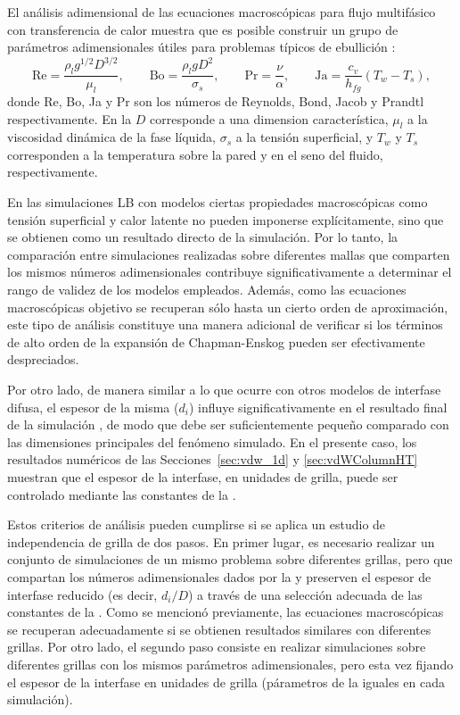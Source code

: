 El an\'alisis adimensional de las ecuaciones macrosc\'opicas para flujo multif\'asico con transferencia de calor muestra que es posible construir un grupo de par\'ametros adimensionales \'utiles para problemas t\'ipicos de ebullici\'on \cite{ajaev_modeling_2006, hua_numerical_2007}:
\begin{equation}
	\mbox{Re} = \dfrac{\rho_l g^{1/2} D^{3/2}}{\mu_l}, \qquad
	\mbox{Bo} = \dfrac{\rho_l g D^2}{\sigma_s}, \qquad
	\mbox{Pr} = \dfrac{\nu}{\alpha}, \qquad
	\mbox{Ja} = \dfrac{c_v}{h_{fg}}(T_w-T_s),
	\label{eq:num_adim_hetb}
\end{equation}
donde Re, Bo, Ja y Pr son los n\'umeros de Reynolds, Bond, Jacob y Prandtl respectivamente. En la  $D$ corresponde a una dimension caracter\'istica, $\mu_l$ a la viscosidad din\'amica de la fase l\'iquida, $\sigma_s$ a la tensi\'on superficial, y $T_w$ y $T_s$ corresponden a la temperatura sobre la pared y en el seno del fluido, respectivamente. 

En las simulaciones LB con modelos \pp{} ciertas propiedades macrosc\'opicas como tensi\'on superficial y calor latente no pueden imponerse expl\'icitamente, sino que se obtienen como un resultado directo de la simulaci\'on. Por lo tanto, la comparaci\'on entre simulaciones realizadas sobre diferentes mallas que comparten los mismos n\'umeros adimensionales contribuye significativamente a determinar el rango de validez de los modelos empleados. Adem\'as, como las ecuaciones macrosc\'opicas objetivo se recuperan s\'olo hasta un cierto orden de aproximaci\'on, este tipo de an\'alisis constituye una manera adicional de verificar si los t\'erminos de alto orden de la expansi\'on de Chapman-Enskog pueden ser efectivamente despreciados.

Por otro lado, de manera similar a lo que ocurre con otros modelos de interfase difusa, el espesor de la misma ($d_i$) influye significativamente en el resultado final de la simulaci\'on \cite{ding_diffuse_2007}, de modo que debe ser suficientemente peque\~no comparado con las dimensiones principales del fen\'omeno simulado. En el presente caso, los resultados num\'ericos de las Secciones~\ref{sec:vdw_1d} y \ref{sec:vdWColumnHT} muestran que el espesor de la interfase, en unidades de grilla, puede ser controlado mediante las constantes de la \eos{}. 

Estos criterios de an\'alisis pueden cumplirse si se aplica un estudio de independencia de grilla de dos pasos. En primer lugar, es necesario realizar un conjunto de simulaciones de un mismo problema sobre diferentes grillas, pero que compartan los n\'umeros adimensionales dados por la  y preserven el espesor de interfase reducido (es decir, $d_i/D$) a trav\'es de una selecci\'on adecuada de las constantes de la \eos{}. Como se mencion\'o previamente, las ecuaciones macrosc\'opicas se recuperan adecuadamente si se obtienen resultados similares con diferentes grillas. Por otro lado, el segundo paso consiste en realizar simulaciones sobre diferentes grillas con los mismos par\'ametros adimensionales, pero esta vez fijando el espesor de la interfase en unidades de grilla (p\'arametros de la \eos{} iguales en cada simulaci\'on). \newline

